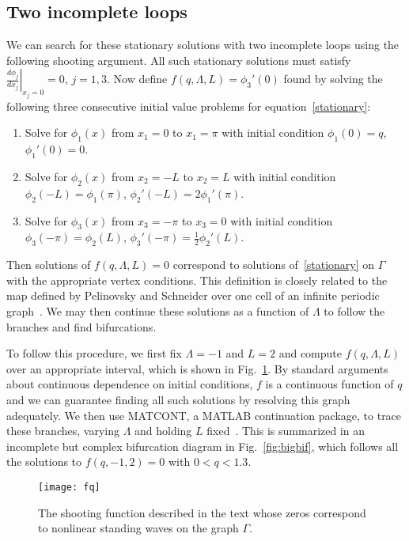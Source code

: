 \documentclass{article}
\numberwithin{equation}{section}
\numberwithin{figure}{section}
\begin{document}
\subsection{Two incomplete loops}
\label{sec:2incomplete}

We can search for these stationary solutions with two incomplete loops using the following shooting argument. All such stationary solutions must satisfy $\left.\frac{d \phi_j}{d x_j}\right\rvert_{x_j=0}=0 $, $j=1,3$. Now define $f(q,\Lambda,L)=\phi_3'(0)$ found by solving the following three consecutive initial value problems for equation~\eqref{stationary}:
\begin{enumerate}
\item Solve for $\phi_1(x)$ from $x_1 = 0$ to $x_1= \pi$ with initial condition $\phi_1(0)=q$, $\phi_1'(0)=0$.
\item Solve for $\phi_2(x)$ from $x_2 = -L$ to $x_2=L$ with initial condition $\phi_2(-L)=\phi_1(\pi)$, $\phi_2'(-L)=2 \phi_1'(\pi)$.
\item  Solve for $\phi_3(x)$ from $x_3 = -\pi$ to $x_3=0$ with initial condition $\phi_3(-\pi)=\phi_2(L)$, $\phi_3'(-\pi)=\frac{1}{2}\phi_2'(L)$.
\end{enumerate}
Then solutions of $f(q,\Lambda,L)=0$ correspond to solutions of~\eqref{stationary} on $\Gamma$ with the appropriate vertex conditions. This definition is closely related to the map defined by Pelinovsky and Schneider over one cell of an infinite periodic graph~\cite{Pelinovsky:2016fm}. We may then continue these solutions as a function of $\Lambda$ to follow the branches and find bifurcations.

To follow this procedure, we first fix $\Lambda=-1$ and $L=2$ and compute $f(q,\Lambda,L)$ over an appropriate interval, which is shown in Fig.~\ref{fig:dumbbellShooter}. By standard arguments about continuous dependence on initial conditions, $f$ is a continuous function of $q$ and we can guarantee finding all such solutions by resolving this graph adequately.	 We then use MATCONT, a MATLAB continuation package, to trace these branches, varying $\Lambda$ and holding $L$ fixed~\cite{Dhooge:2003vy,Dhooge:2008gq}. This is summarized in an incomplete but complex bifurcation diagram in Fig.~\ref{fig:bigbif}, which follows all the solutions to $f(q,-1,2)=0$ with $0<q<1.3$.

\begin{figure}[htbp] %
   \centering
   \texttt{[image: fq]} 
   \caption{The shooting function described in the text whose zeros correspond to nonlinear standing waves on the graph $\Gamma$.}
\label{fig:dumbbellShooter}
\end{figure}
\end{document}
